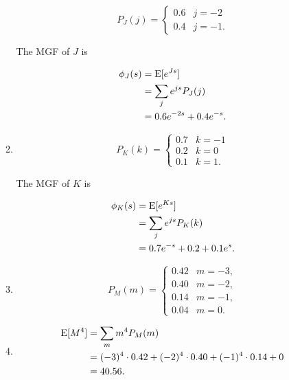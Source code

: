 \documentclass{article}
\begin{document}
\begin{enumerate}
\begin{enumerate}[label=(\alph*)]
        $$P_J(j) = \begin{cases}
            0.6 & j = -2 \\
            0.4 & j = -1.
        \end{cases}
        $$

        The MGF of $J$ is
        
        \begin{align*}
        \phi_J(s) 
            & = \text E[e^{Js}] \\
            & = \sum_j e^{js} P_J(j) \\
            & = 0.6 e^{-2s} + 0.4e^{-s}.
        \end{align*}
        
        \item

        $$P_K(k) = \begin{cases}
            0.7 & k = -1 \\
            0.2 & k = 0 \\
            0.1 & k = 1.
        \end{cases}
        $$

        The MGF of $K$ is
        
        \begin{align*}
        \phi_K(s) 
            & = \text E[e^{Ks}] \\
            & = \sum_j e^{js} P_K(k) \\
            & = 0.7 e^{-s} + 0.2 + 0.1e^s.
        \end{align*}

        \item

        $$P_M(m) = \begin{cases}
            0.42 & m = -3, \\
            0.40 & m = -2, \\
            0.14 & m = -1, \\
            0.04 & m = 0.
        \end{cases}
        $$

        \item

        \begin{align*}
            \text E[M^4]
            & = \sum_m m^4 P_M(m) \\
            & = (-3)^4 \cdot 0.42 + (-2)^4 \cdot 0.40 + (-1)^4 \cdot 0.14 + 0 \\
            & = 40.56.
        \end{align*}
    

\end{enumerate}
\end{enumerate}
\end{document}
